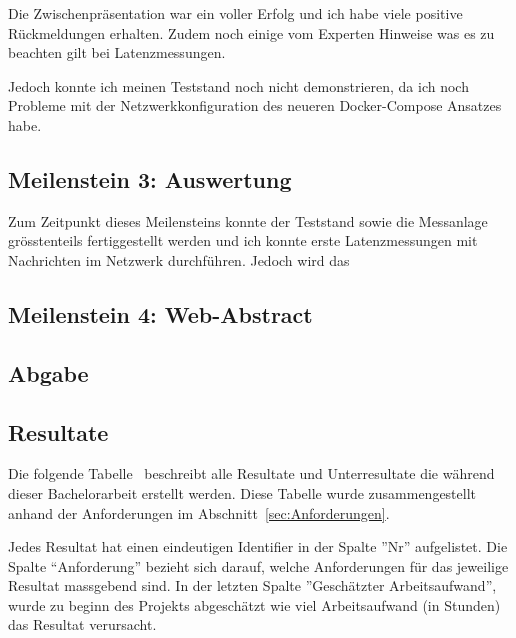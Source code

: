 Die Zwischenpräsentation war ein voller Erfolg und ich habe viele positive Rückmeldungen erhalten.
Zudem noch einige vom Experten Hinweise was es zu beachten gilt bei Latenzmessungen.

Jedoch konnte ich meinen Teststand noch nicht demonstrieren, da ich noch Probleme mit der Netzwerkkonfiguration des neueren Docker-Compose Ansatzes habe.

\subsection{Meilenstein 3: Auswertung}

Zum Zeitpunkt dieses Meilensteins konnte der Teststand sowie die Messanlage grösstenteils fertiggestellt werden und ich konnte erste Latenzmessungen mit Nachrichten im Netzwerk durchführen.
Jedoch wird das 

\subsection{Meilenstein 4: Web-Abstract}

\subsection{Abgabe}

\subsection{Resultate}

Die folgende Tabelle~ beschreibt alle Resultate und Unterresultate die während dieser Bachelorarbeit erstellt werden.
Diese Tabelle wurde zusammengestellt anhand der Anforderungen im Abschnitt~\ref{sec:Anforderungen}.

Jedes Resultat hat einen eindeutigen Identifier in  der Spalte ''Nr'' aufgelistet.
Die Spalte ``Anforderung'' bezieht sich darauf, welche Anforderungen für das jeweilige Resultat massgebend sind.
In der letzten Spalte ''Geschätzter Arbeitsaufwand'', wurde zu beginn des Projekts abgeschätzt wie viel Arbeitsaufwand (in Stunden) das Resultat verursacht.


